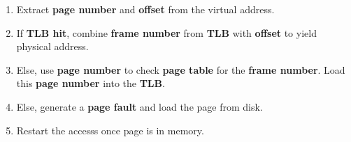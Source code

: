 \documentclass[12pt, letterpaper]{article}
\begin{document}
\begin{enumerate}
  \item Extract \textbf{page number} and \textbf{offset} from the
    virtual address.
  \item If \textbf{TLB hit}, combine \textbf{frame number} from
    \textbf{TLB} with \textbf{offset} to yield physical address.
  \item Else, use \textbf{page number} to check \textbf{page table}
    for the \textbf{frame number}. Load this \textbf{page number}
    into the \textbf{TLB}.
  \item Else, generate a \textbf{page fault} and load the page from disk.
  \item Restart the accesss once page is in memory.
\end{enumerate}
\end{document}
